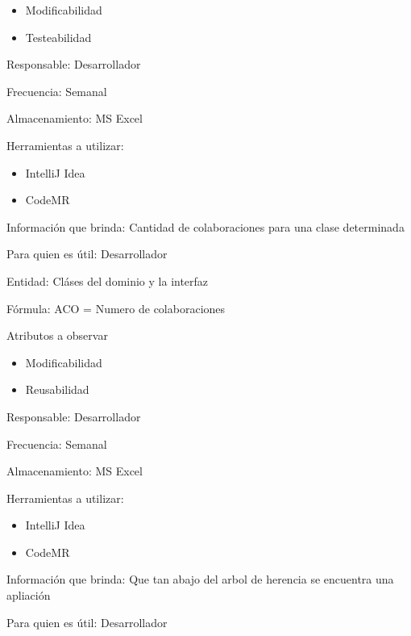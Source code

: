 {{\begin{itemize}
                \item Modificabilidad
                \item Testeabilidad
            \end{itemize}
        \item Responsable: Desarrollador
        \item Frecuencia: Semanal
        \item Almacenamiento: MS Excel
        \item Herramientas a utilizar:
        \begin{itemize}
            \item IntelliJ Idea
            \item CodeMR
        \end{itemize}
    }
     {
        \item Información que brinda: Cantidad de colaboraciones para una clase determinada
        \item Para quien es útil: Desarrollador
        \item Entidad: Cláses del dominio y la interfaz
        \item Fórmula: ACO =  Numero de colaboraciones
        \item Atributos a observar
            \begin{itemize}
                \item Modificabilidad
                \item Reusabilidad
            \end{itemize}
        \item Responsable: Desarrollador
        \item Frecuencia: Semanal
        \item Almacenamiento: MS Excel
        \item Herramientas a utilizar:
        \begin{itemize}
            \item IntelliJ Idea
            \item CodeMR
        \end{itemize}
    }
     {
        \item Información que brinda: Que tan abajo del arbol de herencia se encuentra una apliación
        \item Para quien es útil: Desarrollador
}}
